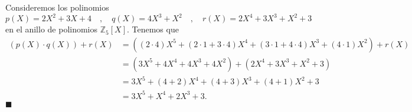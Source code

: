 \begin{example}
Consideremos los polinomios 
$$p(X) = 2X^2 + 3X + 4 \quad , \quad q(X) = 4X^3 + X^2 \quad , \quad r(X) = 2X^4 + 3X^3 + X^2 + 3$$
en el anillo de polinomios $\mathbb{Z}_5[X]$. Tenemos que
\begin{align*}
(p(X) \cdot q(X)) + r(X) &= \left((2 \cdot 4)X^5 + (2 \cdot 1 + 3 \cdot 4)X^4 + (3 \cdot 1 + 4 \cdot 4)X^3 + (4 \cdot 1)X^2 \right) + r(X) \\
&= (3X^5 + 4X^4 + 4X^3 + 4X^2) + (2X^4 + 3X^3 + X^2 + 3) \\
&= 3X^5 + (4 + 2)X^4 + (4 + 3)X^3 + (4 + 1)X^2 + 3 \\
&= 3X^5 + X^4 + 2X^3 + 3.
\end{align*}
\hfill$\blacksquare$


\end{example}